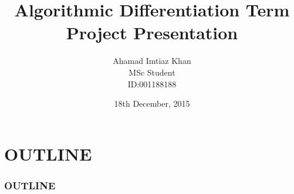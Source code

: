 \documentclass[10pt]{beamer}
\begin{document}
\title {\bfseries{\sc Algorithmic Differentiation Term Project Presentation}}
\author[Ahamad Imtiaz Khan]{\small {Ahamad Imtiaz Khan\\MSc Student\\ID:001188188}}
\date{\small 18th December, 2015} 




\begin{frame}
\titlepage
\end{frame}
\section*{OUTLINE}
\begin{frame}
\frametitle{OUTLINE}  
\tableofcontents
\end{frame}
\end{document}
